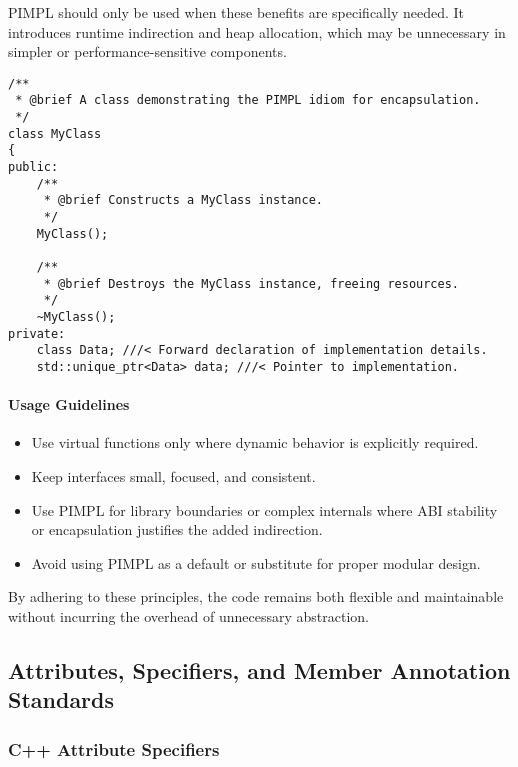 PIMPL should only be used when these benefits are specifically needed. It introduces runtime indirection and heap allocation, which may be unnecessary in simpler or performance-sensitive components.
\begin{lstlisting}[style=cppstyle]
/**
 * @brief A class demonstrating the PIMPL idiom for encapsulation.
 */
class MyClass 
{
public:
    /**
     * @brief Constructs a MyClass instance.
     */
    MyClass();
    
    /**
     * @brief Destroys the MyClass instance, freeing resources.
     */
    ~MyClass();
private:
    class Data; ///< Forward declaration of implementation details.
    std::unique_ptr<Data> data; ///< Pointer to implementation.
\end{lstlisting}

\paragraph{Usage Guidelines}

\begin{itemize}
    \item Use virtual functions only where dynamic behavior is explicitly required.
    \item Keep interfaces small, focused, and consistent.
    \item Use PIMPL for library boundaries or complex internals where ABI stability or encapsulation justifies the added indirection.
    \item Avoid using PIMPL as a default or substitute for proper modular design.
\end{itemize}

By adhering to these principles, the code remains both flexible and maintainable without incurring the overhead of unnecessary abstraction.



\subsection{Attributes, Specifiers, and Member Annotation Standards}

\subsubsection*{C++ Attribute Specifiers}

